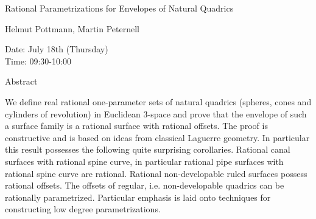 \begin{center}
\LARGE
Rational Parametrizations for Envelopes of Natural Quadrics
\end{center}

\begin{center}
\Large
Helmut Pottmann, Martin Peternell
\end{center}

\noindent
Date:  July 18th (Thursday)\\
Time:  09:30-10:00\\

\begin{center}
\large
Abstract
\end{center}

We define real rational one-parameter sets of natural quadrics (spheres, cones and cylinders of
revolution) in Euclidean 3-space and prove that the envelope of such a surface family is a rational
surface with rational offsets. The proof is constructive and is based on ideas from classical
Laguerre geometry. In particular this result possesses the following quite surprising corollaries.
Rational canal surfaces with rational spine curve, in particular rational pipe surfaces with rational
spine curve are rational. Rational non-developable ruled surfaces possess rational offsets. The
offsets of regular, i.e. non-developable quadrics can be rationally parametrized. Particular
emphasis is laid onto techniques for constructing low degree parametrizations. 

